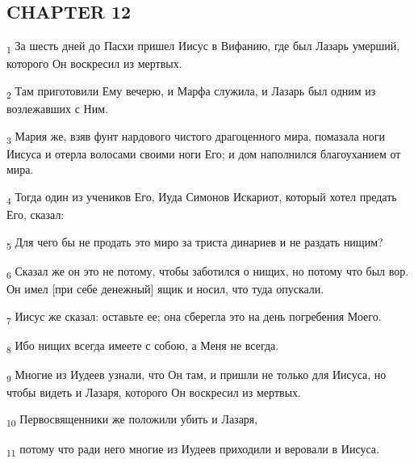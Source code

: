 \subsection{CHAPTER 12}
\begin{tcolorbox}
\textsubscript{1} За шесть дней до Пасхи пришел Иисус в Вифанию, где был Лазарь умерший, которого Он воскресил из мертвых.
\end{tcolorbox}
\begin{tcolorbox}
\textsubscript{2} Там приготовили Ему вечерю, и Марфа служила, и Лазарь был одним из возлежавших с Ним.
\end{tcolorbox}
\begin{tcolorbox}
\textsubscript{3} Мария же, взяв фунт нардового чистого драгоценного мира, помазала ноги Иисуса и отерла волосами своими ноги Его; и дом наполнился благоуханием от мира.
\end{tcolorbox}
\begin{tcolorbox}
\textsubscript{4} Тогда один из учеников Его, Иуда Симонов Искариот, который хотел предать Его, сказал:
\end{tcolorbox}
\begin{tcolorbox}
\textsubscript{5} Для чего бы не продать это миро за триста динариев и не раздать нищим?
\end{tcolorbox}
\begin{tcolorbox}
\textsubscript{6} Сказал же он это не потому, чтобы заботился о нищих, но потому что был вор. Он имел [при себе денежный] ящик и носил, что туда опускали.
\end{tcolorbox}
\begin{tcolorbox}
\textsubscript{7} Иисус же сказал: оставьте ее; она сберегла это на день погребения Моего.
\end{tcolorbox}
\begin{tcolorbox}
\textsubscript{8} Ибо нищих всегда имеете с собою, а Меня не всегда.
\end{tcolorbox}
\begin{tcolorbox}
\textsubscript{9} Многие из Иудеев узнали, что Он там, и пришли не только для Иисуса, но чтобы видеть и Лазаря, которого Он воскресил из мертвых.
\end{tcolorbox}
\begin{tcolorbox}
\textsubscript{10} Первосвященники же положили убить и Лазаря,
\end{tcolorbox}
\begin{tcolorbox}
\textsubscript{11} потому что ради него многие из Иудеев приходили и веровали в Иисуса.
\end{tcolorbox}
